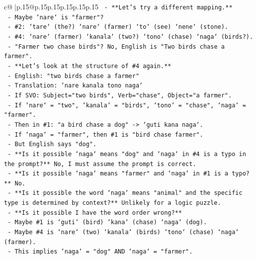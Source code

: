 \documentclass{article}
\begin{document}
{\begin{supertabular}{c@{$\;$}|p{.15\linewidth}@{}p{.15\linewidth}p{.15\linewidth}p{.15\linewidth}p{.15\linewidth}p{.15\linewidth}}
{{{\texttt{               {-} **Let's try a different mapping.**} \\
\texttt{                 {-} Maybe `nare` is "farmer"?} \\
\texttt{                   {-} \#2: `tare` (the?) `nare` (farmer) `to` (see) `nene` (stone).} \\
\texttt{                   {-} \#4: `nare` (farmer) `kanala` (two?) `tono` (chase) `naga` (birds?).} \\
\texttt{                   {-} "Farmer two chase birds"? No, English is "Two birds chase a farmer".} \\
\texttt{               {-} **Let's look at the structure of \#4 again.**} \\
\texttt{                 {-} English: "two birds chase a farmer"} \\
\texttt{                 {-} Translation: `nare kanala tono naga`} \\
\texttt{                 {-} If SVO: Subject="two birds", Verb="chase", Object="a farmer".} \\
\texttt{                 {-} If `nare` = "two", `kanala` = "birds", `tono` = "chase", `naga` = "farmer".} \\
\texttt{                 {-} Then in \#1: "a bird chase a dog" {-}> `guti kana naga`.} \\
\texttt{                   {-} If `naga` = "farmer", then \#1 is "bird chase farmer".} \\
\texttt{                   {-} But English says "dog".} \\
\texttt{                   {-} **Is it possible `naga` means "dog" and `naga` in \#4 is a typo in the prompt?** No, I must assume the prompt is correct.} \\
\texttt{                   {-} **Is it possible `naga` means "farmer" and `naga` in \#1 is a typo?** No.} \\
\texttt{                   {-} **Is it possible the word `naga` means "animal" and the specific type is determined by context?** Unlikely for a logic puzzle.} \\
\texttt{                   {-} **Is it possible I have the word order wrong?**} \\
\texttt{                     {-} Maybe \#1 is `guti` (bird) `kana` (chase) `naga` (dog).} \\
\texttt{                     {-} Maybe \#4 is `nare` (two) `kanala` (birds) `tono` (chase) `naga` (farmer).} \\
\texttt{                     {-} This implies `naga` = "dog" AND `naga` = "farmer".} \\
}}}
\end{supertabular}}
\end{document}
